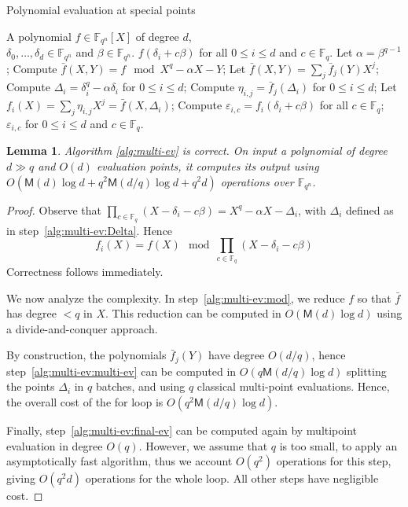 \documentclass{sig-alternate}
\newcommand{\ff}[1]{\mathbb{F}_{#1}}
\newcommand{\dd}{d}
\newcommand{\qq}{q}
\newcommand{\nn}{n}
\newcommand{\qn}{{\qq^\nn}}
\newcommand{\basef}{\ff{\qq}}
\newcommand{\extf}{\ff{\qn}}
\newcommand{\Mul}{\mathsf{M}}
\newcounter{algo}
\newtheorem{Lem}{Lemma}
\begin{document}
\begin{algorithm}
  \caption{Polynomial evaluation at special points}
  \label{alg:multi-ev}
  \begin{algorithmic}[1]
    \REQUIRE A polynomial $f\in\extf[X]$ of degree $\dd$,\\
    $\delta_0,\dots,\delta_\dd\in\extf$ and $\beta\in\extf$.
    \ENSURE $f(\delta_i+c\beta)$ for all $0\le i \le \dd$ and $c\in\basef$.
    \STATE Let $\alpha = \beta^{\qq-1}$;
    \STATE\label{alg:multi-ev:mod} Compute $\bar{f}(X,Y) = f \mod X^\qq-\alpha X-Y$;
    \STATE Let $\bar{f}(X,Y) = \sum_j \bar{f}_j(Y)X^j$;
    \STATE\label{alg:multi-ev:Delta} Compute $\Delta_i=\delta_i^\qq-\alpha\delta_i$ for $0\le i\le\dd$;
    \FOR {$0\le j<\qq$}
    \STATE\label{alg:multi-ev:multi-ev} Compute $\eta_{i,j}=\bar{f}_j(\Delta_i)$ for $0\le i\le\dd$;
    \ENDFOR
    \STATE Let $f_i(X) = \sum_j \eta_{i,j}X^j=\bar{f}(X,\Delta_i)$;
    \FOR {$0\le i \le\dd$}
    \STATE\label{alg:multi-ev:final-ev} Compute $\varepsilon_{i,c}=f_i(\delta_i+c\beta)$ for all $c\in\basef$;
    \ENDFOR
    \RETURN $\varepsilon_{i,c}$ for $0\le i\le\dd$ and $c\in\basef$.
  \end{algorithmic}
\end{algorithm}

\begin{Lem}
  \label{lem:multi-ev}
  Algorithm \ref{alg:multi-ev} is correct. On input a polynomial of
  degree $\dd\gg\qq$ and $O(\dd)$ evaluation points, it computes its
  output using $O(\Mul(\dd) \log\dd + \qq^2\Mul(\dd/\qq)\log\dd +
  \qq^2\dd)$ operations over $\extf$.
\end{Lem}
\begin{proof}
  Observe that
  $\prod_{c\in\basef}(X-\delta_i-c\beta)=X^\qq-\alpha X-\Delta_i$, with
  $\Delta_i$ defined as in step~\ref{alg:multi-ev:Delta}. Hence
  \begin{equation*}
    f_i(X)=f(X)\mod \prod_{c\in\basef}(X-\delta_i-c\beta)
  \end{equation*}
  Correctness follows immediately.

  We now analyze the complexity. In step~\ref{alg:multi-ev:mod}, we
  reduce $f$ so that $\bar{f}$ has degree $<\qq$ in $X$. This
  reduction can be computed in $O(\Mul(d)\log d)$ using a
  divide-and-conquer approach.

  By construction, the polynomials $\bar{f}_j(Y)$ have degree
  $O(\dd/\qq)$, hence step~\ref{alg:multi-ev:multi-ev} can be computed
  in $O(\qq\Mul(\dd/\qq)\log\dd)$ splitting the points $\Delta_i$ in
  $q$ batches, and using $\qq$ classical multi-point
  evaluations. Hence, the overall cost of the for loop is
  $O(\qq^2\Mul(\dd/\qq)\log\dd)$.

  Finally, step~\ref{alg:multi-ev:final-ev} can be computed again by
  multipoint evaluation in degree $O(\qq)$. However, we assume that
  $\qq$ is too small, to apply an asymptotically fast algorithm, thus
  we account $O(\qq^2)$ operations for this step, giving $O(\qq^2\dd)$
  operations for the whole loop. All other steps have negligible cost.
\end{proof}
\end{document}

